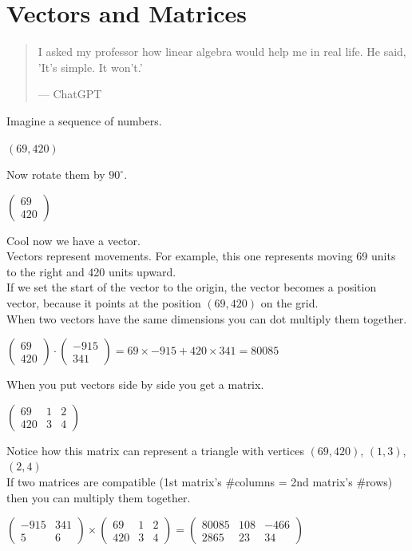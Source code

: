 \documentclass[11pt]{scrartcl}
\begin{document}
\section{Vectors and Matrices}
\begin{abstract}
  \sffamily
  I asked my professor how linear algebra would help me in real life. He said, 'It's simple. It won't.'
  \medskip
  
  --- ChatGPT
\end{abstract}
Imagine a sequence of numbers.
\begin{center}$(69, 420)$\end{center}
Now rotate them by $90^{\circ}$.
\begin{center}$\begin{pmatrix} 69\\420 \end{pmatrix}$\end{center}
Cool now we have a vector.\\
Vectors represent movements. For example, this one represents moving 69 units to the right and 420 units upward. \\
If we set the start of the vector to the origin, the vector becomes a position vector, because it points at the position $(69, 420)$ on the grid.\\
When two vectors have the same dimensions you can dot multiply them together.
\begin{center}$\begin{pmatrix} 69\\420 \end{pmatrix} \cdot \begin{pmatrix} -915\\341 \end{pmatrix} = 69\times-915 + 420\times341 = 80085$\end{center}
When you put vectors side by side you get a matrix. 
\begin{center}$\begin{pmatrix} 69 & 1 & 2 \\ 420 & 3 & 4 \end{pmatrix}$\end{center}
Notice how this matrix can represent a triangle with vertices $(69, 420)$, $(1, 3)$, $(2, 4)$\\
If two matrices are compatible (1st matrix's \#columns = 2nd matrix's \#rows) then you can multiply them together.
\begin{center}
  $\begin{pmatrix} -915 & 341 \\ 5 & 6 \end{pmatrix}
  \times
  \begin{pmatrix} 69 & 1 & 2 \\ 420 & 3 & 4 \end{pmatrix}
  =
  \begin{pmatrix} 80085 & 108 & -466 \\ 2865 & 23 & 34 \end{pmatrix}$
\end{center}
\end{document}
